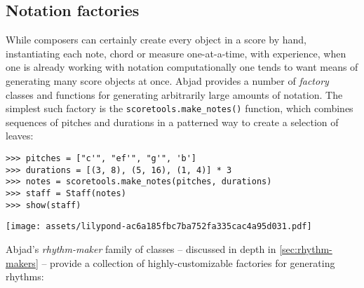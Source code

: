 \subsection{Notation factories}
\label{ssec:notation-factories}

While composers can certainly create every object in a score by hand,
instantiating each note, chord or measure one-at-a-time, with experience, when
one is already working with notation computationally one tends to want means of
generating many score objects at once. Abjad provides a number of
\emph{factory} classes and functions for generating arbitrarily large amounts
of notation. The simplest such factory is the \texttt{scoretools.make\_notes()}
function, which combines sequences of pitches and durations in a patterned way
to create a selection of leaves:

\begin{comment}
<abjad>
pitches = ["c'", "ef'", "g'", 'b']
durations = [(3, 8), (5, 16), (1, 4)] * 3
notes = scoretools.make_notes(pitches, durations)
staff = Staff(notes)
show(staff)
</abjad>
\end{comment}

\begin{abjadbookoutput}
\begin{singlespacing}
\vspace{-0.5\baselineskip}
\begin{verbatim}
>>> pitches = ["c'", "ef'", "g'", 'b']
>>> durations = [(3, 8), (5, 16), (1, 4)] * 3
>>> notes = scoretools.make_notes(pitches, durations)
>>> staff = Staff(notes)
>>> show(staff)
\end{verbatim}
\noindent\texttt{[image: assets/lilypond-ac6a185fbc7ba752fa335cac4a95d031.pdf]}
\end{singlespacing}
\end{abjadbookoutput}

\noindent Abjad's \emph{rhythm-maker} family of classes -- discussed in depth
in \autoref{sec:rhythm-makers} -- provide a collection of highly-customizable
factories for generating rhythms:

\begin{comment}
<abjad>
rhythm_maker = rhythmmakertools.TaleaRhythmMaker(
    talea=rhythmmakertools.Talea(
        counts=[1, 2, 3, 4],
        denominator=16,
        ),
    tie_specifier=rhythmmakertools.TieSpecifier(
        tie_across_divisions=True,
        ),
    )
divisions = [(3, 8), (5, 8), (2, 8), (3, 8), (3, 8)]
rhythm = rhythm_maker(divisions)
staff = Staff(rhythm)
show(staff)
</abjad>
\end{comment}

